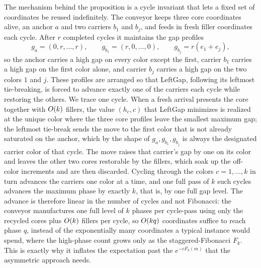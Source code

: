 The mechanism behind the proposition is a cycle invariant that lets a fixed set of coordinates be reused indefinitely. The
conveyor keeps three core coordinates alive, an anchor $a$ and two carriers $b_1$ and $b_j$, and feeds in fresh filler
coordinates each cycle. After $r$ completed cycles it maintains the gap profiles
\[
  g_a=(0,r,\dots,r),\qquad g_{b_1}=(r,0,\dots,0),\qquad g_{b_j}=r(e_1+e_j),
\]
so the anchor carries a high gap on every color except the first, carrier $b_1$ carries a high gap on the first color alone,
and carrier $b_j$ carries a high gap on the two colors $1$ and $j$. These profiles are arranged so that LeftGap, following its
leftmost tie-breaking, is forced to advance exactly one of the carriers each cycle while restoring the others. We trace one
cycle. When a fresh arrival presents the core together with $O(k)$ fillers, the value $(h_c,c)$ that LeftGap minimizes is
realized at the unique color where the three core profiles leave the smallest maximum gap; the leftmost tie-break sends the
move to the first color that is not already saturated on the anchor, which by the shape of $g_a,g_{b_1},g_{b_j}$ is always the
designated carrier color of that cycle. The move raises that carrier's gap by one on its color and leaves the other two cores
restorable by the fillers, which soak up the off-color increments and are then discarded. Cycling through the colors
$c=1,\dots,k$ in turn advances the carriers one color at a time, and one full pass of $k$ such cycles advances the maximum
phase by exactly $k$, that is, by one full gap level. The advance is therefore linear in the number of cycles and not
Fibonacci: the conveyor manufactures one full level of $k$ phases per cycle-pass using only the recycled cores plus $O(k)$
fillers per cycle, so $O(kq)$ coordinates suffice to reach phase $q$, instead of the exponentially many coordinates a
typical instance would spend, where the high-phase count grows only as the staggered-Fibonacci $F_k$. This is exactly why it
inflates the expectation past the $e^{-cF_k(m)}$ that the asymmetric approach needs.

